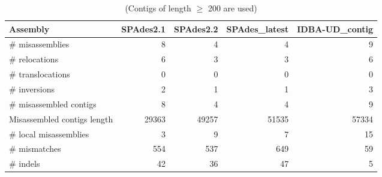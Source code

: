 \begin{table}[ht]
\begin{center}
\caption{(Contigs of length $\geq$ 200 are used)}
\begin{tabular}{|l*{4}{|r}|}
\hline
Assembly & SPAdes2.1 & SPAdes2.2 & SPAdes\_latest & IDBA-UD\_contig \\ \hline
\# misassemblies & 8 & 4 & 4 & 9 \\ \hline
    \# relocations & 6 & 3 & 3 & 6 \\ \hline
    \# translocations & 0 & 0 & 0 & 0 \\ \hline
    \# inversions & 2 & 1 & 1 & 3 \\ \hline
\# misassembled contigs & 8 & 4 & 4 & 9 \\ \hline
Misassembled contigs length & 29363 & 49257 & 51535 & 57334 \\ \hline
\# local misassemblies & 3 & 9 & 7 & 15 \\ \hline
\# mismatches & 554 & 537 & 649 & 59 \\ \hline
\# indels & 42 & 36 & 47 & 5 \\ \hline
\end{tabular}
\end{center}
\end{table}
